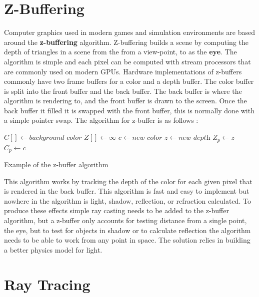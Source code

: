 \documentclass[11pt,a4paper,oneside]{article}
\begin{document}
\section{Z-Buffering}

Computer graphics used in modern games and simulation environments are based around the \textbf{z-buffering} algorithm.  Z-buffering builds a scene by computing the depth of triangles in a scene from the from a view-point,  to as the \textbf{eye}.  The algorithm is simple and each pixel can be computed with stream processors that are commonly  used on modern GPUs.  Hardware implementations of z-buffers commonly have two frame buffers for a color and a depth buffer.    The color buffer is split into the front buffer and the back buffer.  The back buffer is where the algorithm is rendering to, and the front buffer is drawn to the screen.  Once the back buffer it filled it is swapped with the front buffer, this is normally done with a simple pointer swap.  The algorithm for z-buffer is as follows \cite{fast:2008}:

\begin{algorithm}
\begin{algorithmic}[1]
\STATE $C[ ] \gets \textit{background color}$ 
\STATE $Z[ ] \gets \infty$
		\STATE $c \gets \textit{new color}$
		\STATE $z \gets \textit{new depth}$
			\STATE $Z_{p} \gets z$
			\STATE $C_{p} \gets c$
		\ENDIF
	\ENDFOR
\ENDFOR
\end{algorithmic}
\caption{Example of the z-buffer algorithm}
\label{z-buffer}
\end{algorithm}

This algorithm works by tracking the depth of the color for each given pixel that is rendered in the back buffer.  This algorithm is fast and easy to implement but nowhere in the algorithm is light, shadow, reflection, or refraction calculated.  To produce these effects simple ray casting needs to be added to the z-buffer algorithm, but a z-buffer only accounts for testing distance from a single point, the eye, but to test for objects in shadow or to calculate reflection the algorithm needs to be able to work from any point in space.  The solution relies in building a better physics model for light.

\section{Ray Tracing}
\end{document}
